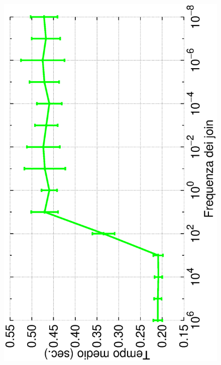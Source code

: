 \documentclass[prodmode,acmtap]{acmlarge}
\begin{document}
\begin{figure}
	\includegraphics[scale=.22, angle=-90]{imgs/norelink-freq-time.eps}
\endminipage\hfill
{}
\centering

\end{figure}
\end{document}
